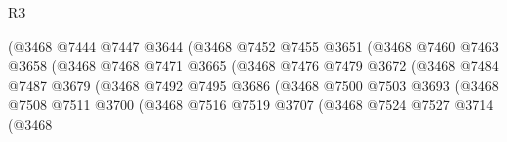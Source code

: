 \begin{lexlean}{R3}
\begin{coremodule}
                                        (@3468
                                          @7444
                                          @7447
                                          @3644
                                          (@3468
                                            @7452
                                            @7455
                                            @3651
                                            (@3468
                                              @7460
                                              @7463
                                              @3658
                                              (@3468
                                                @7468
                                                @7471
                                                @3665
                                                (@3468
                                                  @7476
                                                  @7479
                                                  @3672
                                                  (@3468
                                                    @7484
                                                    @7487
                                                    @3679
                                                    (@3468
                                                      @7492
                                                      @7495
                                                      @3686
                                                      (@3468
                                                        @7500
                                                        @7503
                                                        @3693
                                                        (@3468
                                                          @7508
                                                          @7511
                                                          @3700
                                                          (@3468
                                                            @7516
                                                            @7519
                                                            @3707
                                                            (@3468
                                                              @7524
                                                              @7527
                                                              @3714
                                                              (@3468

\end{coremodule}
\end{lexlean}
